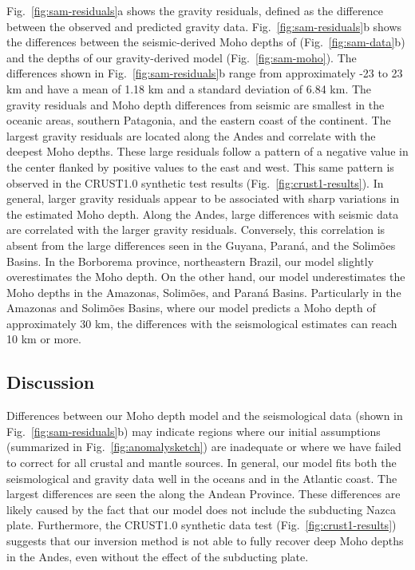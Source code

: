 \documentclass[extra,mreferee]{gji}
\begin{document}
Fig.~\ref{fig:sam-residuals}a shows the gravity residuals,
defined as the difference between the observed and predicted gravity data.
Fig.~\ref{fig:sam-residuals}b shows the differences between
the seismic-derived Moho depths of \citet{assumpcao2013a}
(Fig.~\ref{fig:sam-data}b) and the depths of our gravity-derived model
(Fig.~\ref{fig:sam-moho}).
The differences shown in Fig.~\ref{fig:sam-residuals}b range from approximately
-23 to 23 km and have a mean of 1.18 km and a standard deviation of 6.84 km.
The gravity residuals and Moho depth differences from seismic are smallest in
the oceanic areas, southern Patagonia, and the eastern coast of the continent.
The largest gravity residuals are located along the Andes and correlate with
the deepest Moho depths.
These large residuals follow a pattern of a negative value in the center
flanked by positive values to the east and west.
This same pattern is observed in the CRUST1.0 synthetic test results
(Fig.~\ref{fig:crust1-results}).
In general, larger gravity residuals appear to be associated with sharp
variations in the estimated Moho depth.
Along the Andes, large differences with seismic data are correlated with the
larger gravity residuals.
Conversely, this correlation is absent from the large differences seen in the
Guyana, Paraná, and the Solimões Basins.
In the Borborema province, northeastern Brazil,
our model slightly overestimates the Moho depth.
On the other hand, our model underestimates the Moho depths in the Amazonas,
Solimões, and Paraná Basins.
Particularly in the Amazonas and Solimões Basins, where our model predicts a
Moho depth of approximately 30 km, the differences with the seismological
estimates can reach 10 km or more.

\subsection{Discussion}


Differences between our Moho depth model and the seismological data
(shown in Fig.~\ref{fig:sam-residuals}b)
may indicate regions where our initial assumptions
(summarized in Fig.~\ref{fig:anomalysketch})
are inadequate or where we have
failed to correct for all crustal and mantle sources.
In general, our model fits both the seismological and gravity data well
in the oceans and in the Atlantic coast.
The largest differences are seen the along the Andean Province.
These differences are likely caused by the fact that our model does not include
the subducting Nazca plate.
Furthermore, the CRUST1.0 synthetic data test (Fig.~\ref{fig:crust1-results})
suggests that our inversion method is not able to fully recover deep Moho
depths in the Andes,
even without the effect of the subducting plate.
\end{document}
